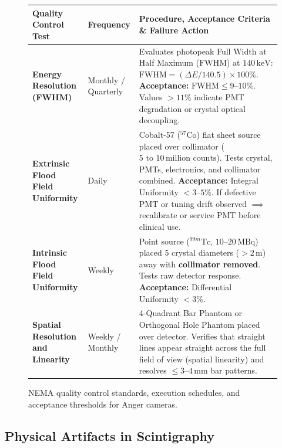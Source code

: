 \documentclass[11pt,a4paper]{article}
\begin{document}
\begin{figure}[htbp]
\centering
\setlength{\tabcolsep}{4pt}
\begin{tabular}{p{3.5cm}p{3.5cm}p{7.4cm}}
\toprule
\textbf{Quality Control Test} & \textbf{Frequency} & \textbf{Procedure, Acceptance Criteria \& Failure Action} \\
\midrule
\textbf{Energy Resolution (FWHM)} & Monthly / Quarterly & Evaluates photopeak Full Width at Half Maximum ($\text{FWHM}$) at $140\,\text{keV}$: $\text{FWHM} = (\Delta E / 140.5) \times 100\%$. \textbf{Acceptance:} $\text{FWHM} \le 9\text{--}10\%$. Values $> 11\%$ indicate PMT degradation or crystal optical decoupling. \\
\addlinespace
\textbf{Extrinsic Flood Field Uniformity} & Daily & Cobalt-57 ($^{57}\text{Co}$) flat sheet source placed over collimator ($5\text{ to }10\,\text{million counts}$). Tests crystal, PMTs, electronics, and collimator combined. \textbf{Acceptance:} Integral Uniformity $< 3\text{--}5\%$. If defective PMT or tuning drift observed $\implies$ recalibrate or service PMT before clinical use. \\
\addlinespace
\textbf{Intrinsic Flood Field Uniformity} & Weekly & Point source ($^{99m}\text{Tc}$, $10\text{--}20\,\text{MBq}$) placed 5 crystal diameters ($> 2\,\text{m}$) away with \textbf{collimator removed}. Tests raw detector response. \textbf{Acceptance:} Differential Uniformity $< 3\%$. \\
\addlinespace
\textbf{Spatial Resolution and Linearity} & Weekly / Monthly & 4-Quadrant Bar Phantom or Orthogonal Hole Phantom placed over detector. Verifies that straight lines appear straight across the full field of view (spatial linearity) and resolves $\le 3\text{--}4\,\text{mm}$ bar patterns. \\
\bottomrule
\end{tabular}
\caption{NEMA quality control standards, execution schedules, and acceptance thresholds for Anger cameras.}
\label{tab:qc_standards}
\end{figure}

\subsection{Physical Artifacts in Scintigraphy}
\end{document}
